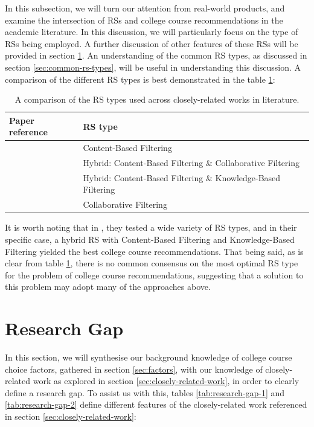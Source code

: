 In this subsection, we will turn our attention from real-world products, and 
examine the intersection of RSs and college course recommendations in the academic literature.
In this discussion, we will particularly focus on the type of RSs being employed.
A further discussion of other features of these RSs will be provided in section \ref{sec:research-gap}.
An understanding of the common RS types, as discussed in section \ref{sec:common-rs-types}, will be useful in understanding this discussion.
A comparison of the different RS types is best demonstrated in the table \ref{tab:rs-lit-comparison}:

\begin{table}[H]
\begin{tabular}{ |p{5cm}|p{10cm}|}
 \hline
 \textbf{Paper reference} & \textbf{RS type}\\
 \hline
 \cite{qamhieh2020pcrs}   & Content-Based Filtering\\
 \hline
 \cite{ghuge2023envisioning} &   Hybrid: Content-Based Filtering \& Collaborative Filtering\\
 \hline
 \cite{lahoud2023comparative} & Hybrid: Content-Based Filtering \& Knowledge-Based Filtering\\
 \hline
 \cite{su2021personality}    & Collaborative Filtering\\
 \hline
\end{tabular}
\caption{A comparison of the RS types used across closely-related works in literature.}
\label{tab:rs-lit-comparison}
\end{table}

It is worth noting that in \cite{lahoud2023comparative}, they tested a wide variety of RS types,
and in their specific case, a hybrid RS with Content-Based Filtering and Knowledge-Based Filtering yielded the best college course recommendations.
That being said, as is clear from table \ref{tab:rs-lit-comparison}, 
there is no common consensus on the most optimal RS type for the problem of college course recommendations,
suggesting that a solution to this problem may adopt many of the approaches above.

\section{Research Gap}
\label{sec:research-gap}

In this section, we will synthesise our background knowledge of college course choice factors, gathered in section \ref{sec:factors},
with our knowledge of closely-related work as explored in section \ref{sec:closely-related-work},
in order to clearly define a research gap.
To assist us with this, tables \ref{tab:research-gap-1} and \ref{tab:research-gap-2} define different features of the closely-related work referenced in section \ref{sec:closely-related-work}:

